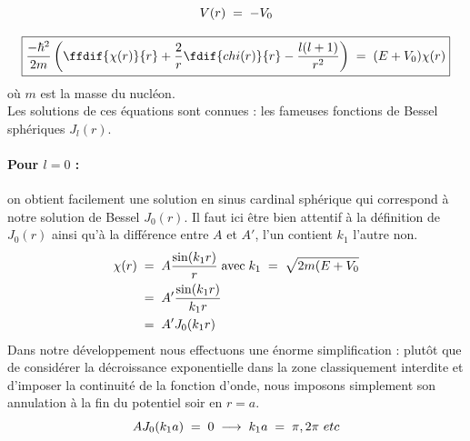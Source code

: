 \[
    V(r) \; = \; -V_0
\]

\[
    \boxed{
       \dfrac{-\hbar^2}{2m} \left(\ffdif{\chi(r)}{r} + \dfrac{2}{r}\fdif{chi(r)}{r} - \dfrac{l(l+1)}{r^2}\right)\eq (E+V_0)\chi(r)
    }
\]
où $m$ est la masse du nucléon.\\
Les solutions de ces équations sont connues : les fameuses fonctions de Bessel sphériques $J_l(r)$.
\paragraph{Pour $l=0$ :} on obtient facilement une solution en sinus cardinal sphérique qui correspond à notre solution de Bessel $J_0(r)$. Il faut ici être bien attentif à la définition de $J_0(r)$ ainsi qu'à la différence entre $A$ et $A'$, l'un contient $k_1$ l'autre non.
\begin{align*}
    \chi(r) &\; = \; A\dfrac{\sin(k_1r)}{r}\; \text{avec}\; k_1 \; = \; \sqrt{2m(E+V_0}\\
    &\; = \; A' \dfrac{\sin(k_1r)}{k_1 r}\\
    &\; = \; A'J_0(k_1 r)
\end{align*}
Dans notre développement nous effectuons une énorme simplification : plutôt que de considérer la décroissance exponentielle dans la zone classiquement interdite et d'imposer la continuité de la fonction d'onde, nous imposons simplement son annulation à la fin du potentiel soir en $r = a$.
\[
    AJ_0(k_1a) \; = \; 0 \; \longrightarrow \; k_1 a \; = \; \pi,2\pi \ etc
\]
